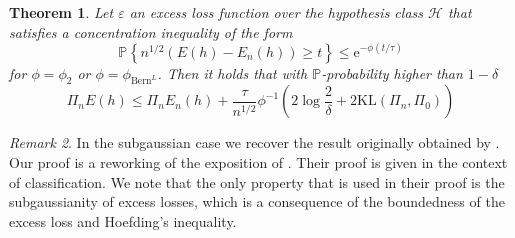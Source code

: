 \documentclass{uvamath}
\newcommand*{\calH}{\mathcal{H}}
\newcommand*{\bbP}{\mathbb{P}}
\newcommand*{\prob}[2][]{\mathbb{P}_{#1}\left\{#2\right\}}
\newcommand*{\paren}[1]{\left(#1\right)}
\newcommand*{\rme}{\mathrm{e}}
\newcommand*{\KL}{\mathrm{KL}}
\newtheorem{theorem}{Theorem}[section]
\theoremstyle{remark}
\newtheorem{remark}[theorem]{Remark}
\theoremstyle{definition}
\theoremstyle{definition}
\theoremstyle{definition}
\theoremstyle{definition}
\theoremstyle{definition}
\begin{document}
\begin{theorem}\label{thm:pac_bayesian_bound}
  Let $\varepsilon$ an excess loss function over the hypothesis class
  $\calH$ that satisfies a concentration inequality of the form
  \begin{equation*}
    \prob{n^{1/2}(E(h) - E_n(h))\geq t}\leq \rme^{-\phi(t/\tau)}
  \end{equation*}
  for $\phi = \phi_2$ or $\phi = \phi_{\text{Bern}^L}$.
  Then it holds that with $\bbP$-probability higher than $1-\delta$
  \begin{equation*}
    \Pi_nE(h) \leq \Pi_nE_n(h) +
    \frac{\tau}{n^{1/2}}\phi^{-1}\paren{2\log\frac{2}{\delta} +
          2\KL(\Pi_n,\Pi_0)}
  \end{equation*}
\end{theorem}
\begin{remark}
  In the subgaussian case we recover the result originally obtained by
  \citet{mcallester_pac-bayesian_1998}. Our proof is a reworking of
  the exposition of \citet[Section 6]{boucheron_theory_2005}. Their
  proof is given in the context of classification. We note that the
  only property that is used in their proof is the subgaussianity of
  excess losses, which is a consequence of the boundedness of the
  excess loss and Hoefding's inequality.
\end{remark}
\end{document}
